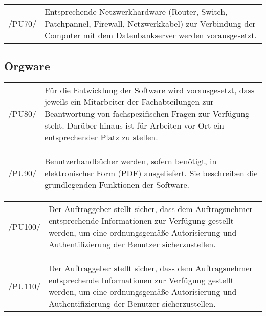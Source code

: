 \begin{tabular}{p{1.5cm}p{14.5cm}}

	 /PU70/	&  Entsprechende Netzwerkhardware (Router, Switch, Patchpannel, Firewall, Netzwerkkabel) zur Verbindung der Computer mit dem Datenbankserver werden vorausgesetzt.\\[0.25cm]


\end{tabular}



\subsection{Orgware}
\label{subsec:orgware}

\begin{tabular}{p{1.5cm}p{14.5cm}}

	 /PU80/	&  Für die Entwicklung der Software wird vorausgesetzt, dass jeweils ein Mitarbeiter der Fachabteilungen zur Beantwortung von fachspezifischen Fragen zur Verfügung steht. Darüber hinaus ist für Arbeiten vor Ort ein entsprechender Platz zu stellen.\\[0.25cm]


\end{tabular}

\begin{tabular}{p{1.5cm}p{14.5cm}}

	 /PU90/	&  Benutzerhandbücher werden, sofern benötigt, in elektronischer Form (PDF) ausgeliefert. Sie beschreiben die grundlegenden Funktionen der Software.\\[0.25cm]


\end{tabular}

\begin{tabular}{p{1.5cm}p{14.5cm}}

	 /PU100/	&  Der Auftraggeber stellt sicher, dass dem Auftragsnehmer entsprechende Informationen zur Verfügung gestellt werden, um eine ordnungsgemäße Autorisierung und Authentifizierung der Benutzer sicherzustellen.\\[0.25cm]


\end{tabular}

\begin{tabular}{p{1.5cm}p{14.5cm}}

	 /PU110/	&  Der Auftraggeber stellt sicher, dass dem Auftragsnehmer entsprechende Informationen zur Verfügung gestellt werden, um eine ordnungsgemäße Autorisierung und Authentifizierung der Benutzer sicherzustellen.\\[0.25cm]


\end{tabular}

